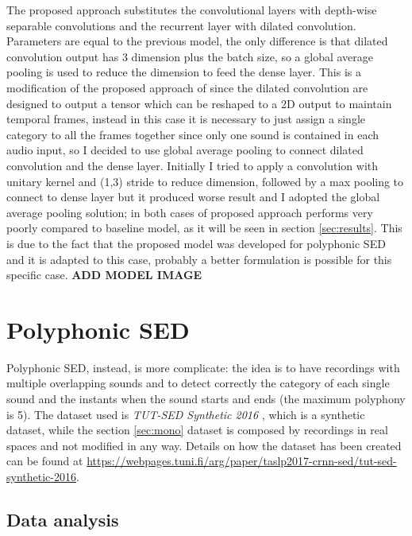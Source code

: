 \documentclass{article}
\begin{document}
The proposed approach substitutes the convolutional layers with depth-wise separable convolutions and the recurrent layer with dilated convolution. Parameters are equal to the previous model, the only difference is that dilated convolution output has 3 dimension plus the batch size, so a global average pooling is used to reduce the dimension to feed the dense layer. This is a modification of the proposed approach of \cite{drossos2020sound} since the dilated convolution are designed to output a tensor which can be reshaped to a 2D output to maintain temporal frames, instead in this case it is necessary to just assign a single category to all the frames together since only one sound is contained in each audio input, so I decided to use global average pooling to connect dilated convolution and the dense layer. Initially I tried to apply a convolution with unitary kernel and (1,3) stride to reduce dimension, followed by a max pooling to connect to dense layer but it produced worse result and I adopted the global average pooling solution; in both cases of proposed approach performs very poorly compared to baseline model, as it will be seen in section \ref{sec:results}. This is due to the fact that the proposed model was developed for polyphonic SED and it is adapted to this case, probably a better formulation is possible for this specific case.\newline
\textbf{ADD MODEL IMAGE}


\section{Polyphonic SED}
\label{sec:poly}

Polyphonic SED, instead, is more complicate: the idea is to have recordings with multiple overlapping sounds and to detect correctly the category of each single sound and the instants when the sound starts and ends (the maximum polyphony is 5). The dataset used is \textit{TUT-SED Synthetic 2016} \cite{Cakir_2017}, which is a synthetic dataset, while the section \ref{sec:mono} dataset is composed by recordings in real spaces and not modified in any way. Details on how the dataset has been created can be found at \url{https://webpages.tuni.fi/arg/paper/taslp2017-crnn-sed/tut-sed-synthetic-2016}.

\subsection{Data analysis}
\label{subsec:poly_analysis}
\end{document}
